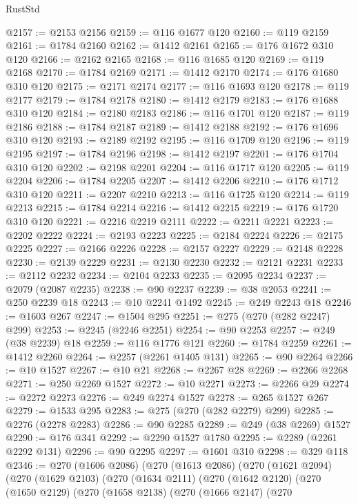 \begin{lexlean}{RustStd}
\begin{coremodule}
@2157 := @2153 @2156
@2159 := @116 @1677 @120
@2160 := @119 @2159
@2161 := @1784 @2160
@2162 := @1412 @2161
@2165 := @176 @1672 @310 @120
@2166 := @2162 @2165
@2168 := @116 @1685 @120
@2169 := @119 @2168
@2170 := @1784 @2169
@2171 := @1412 @2170
@2174 := @176 @1680 @310 @120
@2175 := @2171 @2174
@2177 := @116 @1693 @120
@2178 := @119 @2177
@2179 := @1784 @2178
@2180 := @1412 @2179
@2183 := @176 @1688 @310 @120
@2184 := @2180 @2183
@2186 := @116 @1701 @120
@2187 := @119 @2186
@2188 := @1784 @2187
@2189 := @1412 @2188
@2192 := @176 @1696 @310 @120
@2193 := @2189 @2192
@2195 := @116 @1709 @120
@2196 := @119 @2195
@2197 := @1784 @2196
@2198 := @1412 @2197
@2201 := @176 @1704 @310 @120
@2202 := @2198 @2201
@2204 := @116 @1717 @120
@2205 := @119 @2204
@2206 := @1784 @2205
@2207 := @1412 @2206
@2210 := @176 @1712 @310 @120
@2211 := @2207 @2210
@2213 := @116 @1725 @120
@2214 := @119 @2213
@2215 := @1784 @2214
@2216 := @1412 @2215
@2219 := @176 @1720 @310 @120
@2221 := @2216 @2219 @2111
@2222 := @2211 @2221
@2223 := @2202 @2222
@2224 := @2193 @2223
@2225 := @2184 @2224
@2226 := @2175 @2225
@2227 := @2166 @2226
@2228 := @2157 @2227
@2229 := @2148 @2228
@2230 := @2139 @2229
@2231 := @2130 @2230
@2232 := @2121 @2231
@2233 := @2112 @2232
@2234 := @2104 @2233
@2235 := @2095 @2234
@2237 := @2079 (@2087 @2235)
@2238 := @90 @2237
@2239 := @38 @2053
@2241 := @250 @2239 @18
@2243 := @10 @2241 @1492
@2245 := @249 @2243 @18
@2246 := @1603 @267
@2247 := @1504 @295
@2251 := @275 (@270 (@282 @2247) @299)
@2253 := @2245 (@2246 @2251)
@2254 := @90 @2253
@2257 := @249 (@38 @2239) @18
@2259 := @116 @1776 @121
@2260 := @1784 @2259
@2261 := @1412 @2260
@2264 := @2257 (@2261 @1405 @131)
@2265 := @90 @2264
@2266 := @10 @1527
@2267 := @10 @21
@2268 := @2267 @28
@2269 := @2266 @2268
@2271 := @250 @2269 @1527
@2272 := @10 @2271
@2273 := @2266 @29
@2274 := @2272 @2273
@2276 := @249 @2274 @1527
@2278 := @265 @1527 @267
@2279 := @1533 @295
@2283 := @275 (@270 (@282 @2279) @299)
@2285 := @2276 (@2278 @2283)
@2286 := @90 @2285
@2289 := @249 (@38 @2269) @1527
@2290 := @176 @341
@2292 := @2290 @1527 @1780
@2295 := @2289 (@2261 @2292 @131)
@2296 := @90 @2295
@2297 := @1601 @310
@2298 := @329 @118
@2346 := @270
    (@1606 @2086)
    (@270
      (@1613 @2086)
      (@270
        (@1621 @2094)
        (@270
          (@1629 @2103)
          (@270
            (@1634 @2111)
            (@270
              (@1642 @2120)
              (@270
                (@1650 @2129)
                (@270
                  (@1658 @2138)
                  (@270
                    (@1666 @2147)
                    (@270

\end{coremodule}
\end{lexlean}
